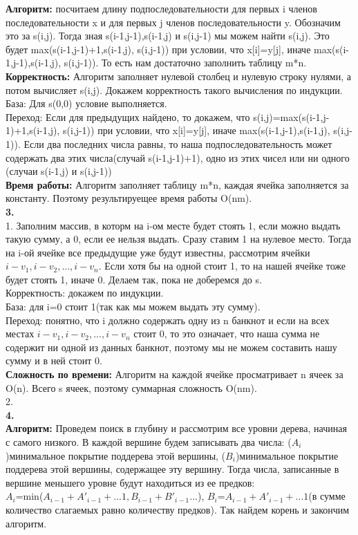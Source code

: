 \documentclass[a4paper,12pt]{article}
\begin{document}
\textbf{Алгоритм:}  посчитаем длину подпоследовательности для первых i членов последовательности x и для первых j членов последовательности y. Обозначим это за s(i,j). Тогда зная s(i-1,j-1),s(i-1,j) и s(i,j-1) мы можем найти s(i,j). Это будет max(s(i-1,j-1)+1,s(i-1,j), s(i,j-1)) при условии, что x[i]=y[j], иначе max(s(i-1,j-1),s(i-1,j), s(i,j-1)). То есть нам достаточно заполнить таблицу m*n.\\
\textbf{Корректность:} Алгоритм заполняет нулевой столбец и нулевую строку нулями, а потом вычисляет s(i,j). Докажем корректность такого вычисления по индукции.\\
База: Для s(0,0) условие выполняется.\\
Переход: Если для предыдущих найдено, то докажем, что s(i,j)=max(s(i-1,j-1)+1,s(i-1,j), s(i,j-1)) при условии, что x[i]=y[j], иначе max(s(i-1,j-1),s(i-1,j), s(i,j-1)). Если два последних числа равны, то наша подпоследовательность может содержать два этих числа(случай s(i-1,j-1)+1), одно из этих чисел или ни одного (случаи s(i-1,j) и s(i,j-1))\\
 \textbf{Время работы:} Алгоритм заполняет таблицу m*n, каждая ячейка заполняется за константу. Поэтому результируещее время работы O(nm).\\
 \textbf{3.}\\
 1. Заполним массив, в которм на i-ом месте будет стоять 1, если можно выдать такую сумму, а 0, если ее нельзя выдать.  Сразу ставим 1 на нулевое место. Тогда на i-ой ячейке все предыдущие уже будут известны, рассмотрим ячейки $i-v_1,i-v_2,...,i-v_n$. Если хотя бы на одной стоит 1, то на нашей ячейке тоже будет стоять 1, иначе 0. Делаем так, пока не доберемся до s.\\
Корректность: докажем по индукции.\\
База: для i=0 стоит 1(так как мы можем выдать эту сумму).\\
Переход: понятно, что i должно содержать одну из n банкнот и если на всех местах $i-v_1,i-v_2,...,i-v_n$ стоит 0, то это означает, что наша сумма не содержит ни одной из данных банкнот, поэтому мы не можем составить нашу сумму и в ней стоит 0.\\
\textbf{Сложность по времени:} Алгоритм на каждой ячейке просматривает n ячеек за O(n). Всего s ячеек, поэтому суммарная сложность O(nm).\\
2.\\
\textbf{4.}\\
\textbf{Алгоритм:} Проведем поиск в глубину и рассмотрим все уровни дерева, начиная с самого низкого. В каждой вершине будем записывать два числа: ($A_i$)минимальное покрытие поддерева этой вершины, ($B_i$)минимальное покрытие поддерева этой вершины, содержащее эту вершину. Тогда числа, записанные в вершине меньшего уровне будут находиться из ее предков:\\$A_i$=min($A_{i-1}+A'_{i-1}+...1,B_{i-1}+B'_{i-1}...$), $B_i$=$A_{i-1}+A'_{i-1}+...1$(в сумме количество слагаемых равно количеству предков). Так найдем корень и закончим алгоритм.\\
\end{document}
